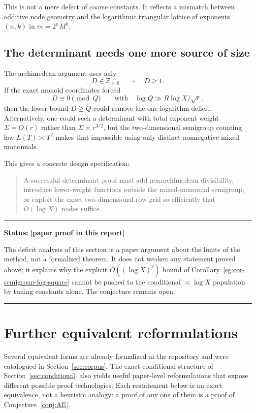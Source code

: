 \documentclass[11pt,oneside]{article}
\theoremstyle{definition}
\theoremstyle{remark}
\newcommand{\Z}{\mathbb Z}
\newcommand{\statusnew}{\textcolor{newgreen}{\textbf{[paper proof in this report]}}}
\newenvironment{statusbox}[1]
{\begin{center}\begin{minipage}{0.94\textwidth}\raggedright\hbadness=10000\hrule
\vspace{0.45em}\textbf{Status:} #1\par\vspace{0.35em}}
{\vspace{0.35em}\hrule\end{minipage}\end{center}}
\begin{document}
This is not a mere defect of coarse constants.  It reflects a mismatch between additive node
geometry and the logarithmic triangular lattice of exponents $(n,k)$ in
$m=2^nM^k$.

\subsection{The determinant needs one more source of size}

The archimedean argument uses only
\[
 D\in\Z_{>0}\quad\Longrightarrow\quad D\ge1.
\]
If the exact monoid coordinates forced
\[
 D\equiv0\pmod{Q}
\qquad\text{with}\quad
 \log Q\gg R\log X/\sqrt r,
\]
then the lower bound $D\ge Q$ could remove the one-logarithm deficit.  Alternatively, one
could seek a determinant with total exponent weight $\Sigma=O(r)$ rather than
$\Sigma\asymp r^{3/2}$, but the two-dimensional semigroup counting law
$L(T)\asymp T^2$ makes that impossible using only distinct nonnegative mixed monomials.

This gives a concrete design specification:

\begin{quote}
A successful determinant proof must add nonarchimedean divisibility, introduce lower-weight
functions outside the mixed-monomial semigroup, or exploit the exact two-dimensional row grid
so efficiently that $O(\!\log X)$ nodes suffice.
\end{quote}

\begin{statusbox}{\statusnew}
The deficit analysis of this section is a paper argument about the limits of the method, not
a formalized theorem.  It does not weaken any statement proved above; it explains why the
explicit $O((\log X)^2)$ bound of Corollary~\ref{sg:cor-semigroup-log-square} cannot be
pushed to the conditional $\asymp\log X$ population by tuning constants alone.  The
conjecture remains open.
\end{statusbox}
\section{Further equivalent reformulations}
\label{sec:reform}

Several equivalent forms are already formalized in the repository and were catalogued in
Section~\ref{sec:corpus}.  The exact conditional structure of Section~\ref{sec:conditional}
also yields useful paper-level reformulations that expose different possible proof
technologies.  Each restatement below is an exact equivalence, not a heuristic analogy: a
proof of any one of them is a proof of Conjecture~\ref{conj:AE}.
\end{document}
